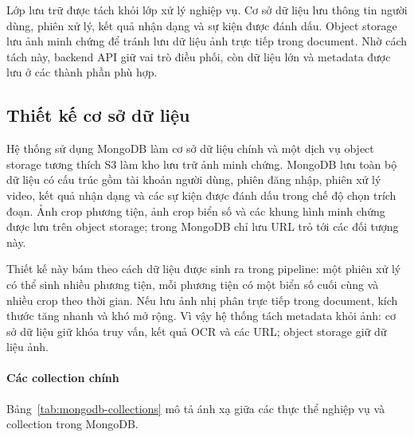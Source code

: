 \documentclass[../DoAn.tex]{subfiles}
\begin{document}
Lớp lưu trữ được tách khỏi lớp xử lý nghiệp vụ. Cơ sở dữ liệu lưu thông tin người dùng, phiên xử lý, kết quả nhận dạng và sự kiện được đánh dấu. Object storage lưu ảnh minh chứng để tránh lưu dữ liệu ảnh trực tiếp trong document. Nhờ cách tách này, backend API giữ vai trò điều phối, còn dữ liệu lớn và metadata được lưu ở các thành phần phù hợp.

\subsection{Thiết kế cơ sở dữ liệu}
\label{subsection:4.2.4}

Hệ thống sử dụng MongoDB làm cơ sở dữ liệu chính và một dịch vụ object storage tương thích S3 làm kho lưu trữ ảnh minh chứng. MongoDB lưu toàn bộ dữ liệu có cấu trúc gồm tài khoản người dùng, phiên đăng nhập, phiên xử lý video, kết quả nhận dạng và các sự kiện được đánh dấu trong chế độ chọn trích đoạn. Ảnh crop phương tiện, ảnh crop biển số và các khung hình minh chứng được lưu trên object storage; trong MongoDB chỉ lưu URL trỏ tới các đối tượng này.

Thiết kế này bám theo cách dữ liệu được sinh ra trong pipeline: một phiên xử lý có thể sinh nhiều phương tiện, mỗi phương tiện có một biển số cuối cùng và nhiều crop theo thời gian. Nếu lưu ảnh nhị phân trực tiếp trong document, kích thước tăng nhanh và khó mở rộng. Vì vậy hệ thống tách metadata khỏi ảnh: cơ sở dữ liệu giữ khóa truy vấn, kết quả OCR và các URL; object storage giữ dữ liệu ảnh.

\paragraph{Các collection chính}

Bảng~\ref{tab:mongodb-collections} mô tả ánh xạ giữa các thực thể nghiệp vụ và collection trong MongoDB.
\end{document}

